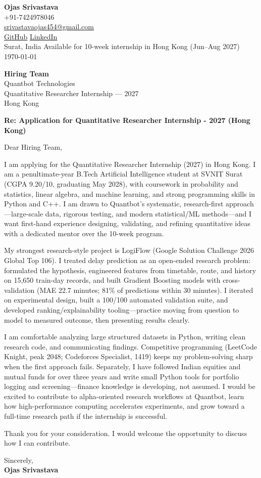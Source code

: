 \documentclass[a4paper,11pt]{article}
\begin{document}
\begin{flushright}
\textbf{Ojas Srivastava} \\
+91-7424978046 \\
\href{mailto:srivastavaojas454@gmail.com}{srivastavaojas454@gmail.com} \\
\href{https://github.com/Ojas-Srivastava05}{GitHub} \textbar{}
\href{https://linkedin.com/in/ojas-srivastava05}{LinkedIn} \\
Surat, India \textbar{} Available for 10-week internship in Hong Kong (Jun--Aug 2027) \\
\today
\end{flushright}

\vspace{4mm}
\textbf{Hiring Team} \\
Quantbot Technologies \\
Quantitative Researcher Internship --- 2027 \\
Hong Kong

\vspace{2mm}
\textbf{Re: Application for Quantitative Researcher Internship - 2027 (Hong Kong)}

Dear Hiring Team,

I am applying for the Quantitative Researcher Internship (2027) in Hong Kong. I am a penultimate-year B.Tech Artificial Intelligence student at SVNIT Surat (CGPA 9.20/10, graduating May 2028), with coursework in probability and statistics, linear algebra, and machine learning, and strong programming skills in Python and C++. I am drawn to Quantbot's systematic, research-first approach---large-scale data, rigorous testing, and modern statistical/ML methods---and I want first-hand experience designing, validating, and refining quantitative ideas with a dedicated mentor over the 10-week program.

My strongest research-style project is LogiFlow (Google Solution Challenge 2026 Global Top 106). I treated delay prediction as an open-ended research problem: formulated the hypothesis, engineered features from timetable, route, and history on 15,650 train-day records, and built Gradient Boosting models with cross-validation (MAE 22.7 minutes; 81\% of predictions within 30 minutes). I iterated on experimental design, built a 100/100 automated validation suite, and developed ranking/explainability tooling---practice moving from question to model to measured outcome, then presenting results clearly.

I am comfortable analyzing large structured datasets in Python, writing clean research code, and communicating findings. Competitive programming (LeetCode Knight, peak 2048; Codeforces Specialist, 1419) keeps my problem-solving sharp when the first approach fails. Separately, I have followed Indian equities and mutual funds for over three years and write small Python tools for portfolio logging and screening---finance knowledge is developing, not assumed. I would be excited to contribute to alpha-oriented research workflows at Quantbot, learn how high-performance computing accelerates experiments, and grow toward a full-time research path if the internship is successful.

Thank you for your consideration. I would welcome the opportunity to discuss how I can contribute.

Sincerely, \\
\vspace{8mm}
\textbf{Ojas Srivastava}
\end{document}
